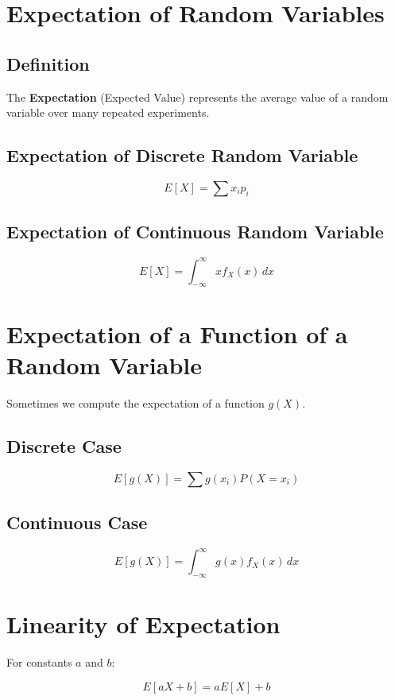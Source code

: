 \documentclass[12pt]{article}
\begin{document}
\section{Expectation of Random Variables}

\subsection{Definition}

The \textbf{Expectation} (Expected Value) represents the average value of a random variable over many repeated experiments.

\subsection{Expectation of Discrete Random Variable}

\[
E[X] = \sum x_i p_i
\]

\subsection{Expectation of Continuous Random Variable}

\[
E[X] = \int_{-\infty}^{\infty} x f_X(x)\,dx
\]

\section{Expectation of a Function of a Random Variable}

Sometimes we compute the expectation of a function $g(X)$.

\subsection{Discrete Case}

\[
E[g(X)] = \sum g(x_i) P(X = x_i)
\]

\subsection{Continuous Case}

\[
E[g(X)] = \int_{-\infty}^{\infty} g(x) f_X(x)\,dx
\]

\section{Linearity of Expectation}

For constants $a$ and $b$:

\[
E[aX + b] = aE[X] + b
\]
\end{document}
